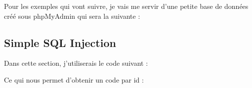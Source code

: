 \documentclass{article}
\begin{document}
Pour les exemples qui vont suivre, je vais me servir d'une petite base de données créé sous phpMyAdmin qui sera la suivante :
\vspace{0.2cm}\\
\vspace{0.2cm}

\subsection{Simple SQL Injection}

Dans cette section, j'utiliserais le code suivant :
\vspace{0.2cm}\\
\vspace{0.2cm}

Ce qui nous permet d'obtenir un code par id :
\vspace{0.2cm}\\
\vspace{0.2cm}
\end{document}
